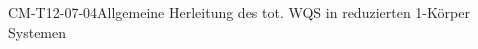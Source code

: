 
\begin{REM}{CM-T12-07-04}{Allgemeine Herleitung des tot. WQS in reduzierten 1-Körper Systemen}
\end{REM}
